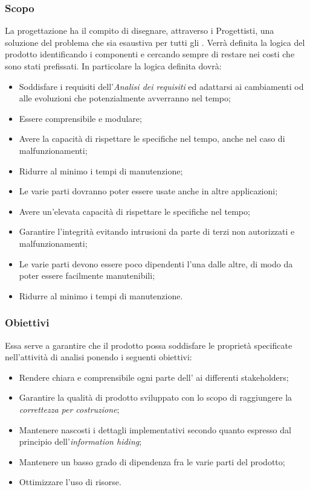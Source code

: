 \subsubsection{Scopo}
La progettazione ha il compito di disegnare, attraverso i Progettisti, una soluzione del problema che sia esaustiva per tutti gli . Verrà definita la logica del prodotto identificando i componenti e cercando sempre di restare nei costi che sono stati prefissati. In particolare la logica definita dovrà:
\begin{itemize}
	\item Soddisfare i requisiti dell’\emph{Analisi dei requisiti} ed adattarsi ai cambiamenti od alle evoluzioni che potenzialmente avverranno nel tempo;
	\item Essere comprensibile e modulare;
	\item Avere la capacità di rispettare le specifiche nel tempo, anche nel caso di malfunzionamenti;
	\item Ridurre al minimo i tempi di manutenzione;
	\item Le varie parti dovranno poter essere usate anche in altre applicazioni;
	\item Avere un'elevata capacità di rispettare le specifiche nel tempo;
	\item Garantire l'integrità evitando intrusioni da parte di terzi non autorizzati e malfunzionamenti;
	\item Le varie parti devono essere poco dipendenti l'una dalle altre, di modo da poter essere facilmente manutenibili;
	\item Ridurre al minimo i tempi di manutenzione.
\end{itemize}
\subsubsection{Obiettivi}
Essa serve a garantire che il prodotto possa soddisfare le proprietà specificate nell'attività di analisi ponendo i seguenti obiettivi:
\begin{itemize}
    \item Rendere chiara e comprensibile ogni parte dell' ai differenti stakeholders;
    \item Garantire la qualità di prodotto sviluppato con lo scopo di raggiungere la \textit{correttezza per costruzione};
    \item Mantenere nascosti i dettagli implementativi secondo quanto espresso dal principio dell'\textit{information hiding};
    \item Mantenere un basso grado di dipendenza fra le varie parti del prodotto;
    \item Ottimizzare l'uso di risorse.
\end{itemize}
